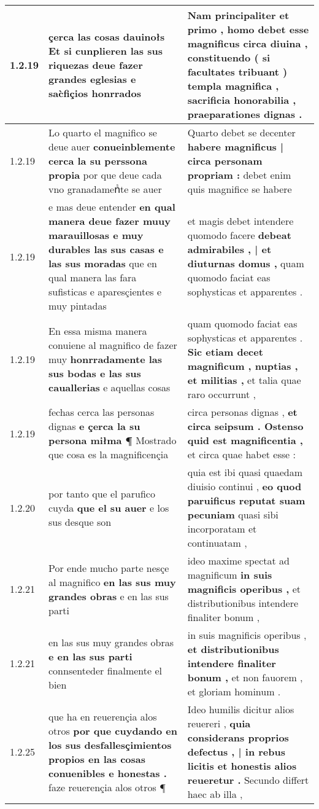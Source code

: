 \begin{tabular}{|p{1cm}|p{6.5cm}|p{6.5cm}|}
1.2.19 & çerca las cosas dauinołs \textbf{ Et si cunplieren las sus riquezas } deue fazer grandes eglesias e sac̀fiçios honrrados & Nam principaliter et primo , \textbf{ homo debet esse magnificus circa diuina , } constituendo ( si facultates tribuant ) templa magnifica , sacrificia honorabilia , praeparationes dignas . \\\hline
1.2.19 & Lo quarto el magnifico se deue auer \textbf{ conueinblemente cerca la su perssona propia } por que deue cada vno granadamenᷤte se auer & Quarto debet se decenter \textbf{ habere magnificus | circa personam propriam : } debet enim quis magnifice se habere \\\hline
1.2.19 & e mas deue entender \textbf{ en qual manera deue fazer muuy marauillosas e muy durables las sus casas e las sus moradas } que en qual manera las fara sufisticas e aparesçientes e muy pintadas & et magis debet intendere quomodo facere \textbf{ debeat admirabiles , | et diuturnas domus , } quam quomodo faciat eas sophysticas et apparentes . \\\hline
1.2.19 & En essa misma manera conuiene al magnifico de fazer muy \textbf{ honrradamente las sus bodas e las sus cauallerias } e aquellas cosas & quam quomodo faciat eas sophysticas et apparentes . \textbf{ Sic etiam decet magnificum , nuptias , et militias , } et talia quae raro occurrunt , \\\hline
1.2.19 & fechas cerca las personas dignas \textbf{ e çerca la su persona miłma ¶ } Mostrado que cosa es la magnificençia & circa personas dignas , \textbf{ et circa seipsum . Ostenso quid est magnificentia , } et circa quae habet esse : \\\hline
1.2.20 & por tanto que el parufico cuyda \textbf{ que el su auer } e los sus desque son & quia est ibi quasi quaedam diuisio continui , \textbf{ eo quod paruificus reputat suam pecuniam } quasi sibi incorporatam et continuatam , \\\hline
1.2.21 & Por ende mucho parte nesçe al magnifico \textbf{ en las sus muy grandes obras } e en las sus parti & ideo maxime spectat ad magnificum \textbf{ in suis magnificis operibus , } et distributionibus intendere finaliter bonum , \\\hline
1.2.21 & en las sus muy grandes obras \textbf{ e en las sus parti } connsenteder finalmente el bien & in suis magnificis operibus , \textbf{ et distributionibus intendere finaliter bonum , } et non fauorem , et gloriam hominum . \\\hline
1.2.25 & que ha en reuerençia alos otros \textbf{ por que cuydando en los sus desfallesçimientos propios en las cosas conuenibles e honestas . } faze reuerençia alos otros ¶ & Ideo humilis dicitur alios reuereri , \textbf{ quia considerans proprios defectus , | in rebus licitis et honestis alios reueretur . } Secundo differt haec ab illa , \\\hline

\end{tabular}
